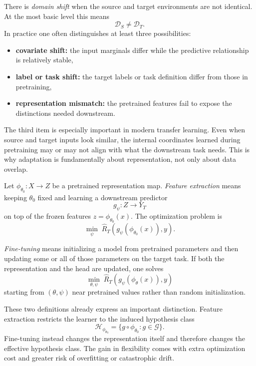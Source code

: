 \begin{definition}
There is \emph{domain shift} when the source and target environments are not identical.
At the most basic level this means
\[
\mathcal{D}_S \neq \mathcal{D}_T.
\]
In practice one often distinguishes at least three possibilities:
\begin{itemize}
    \item \textbf{covariate shift:} the input marginals differ while the predictive relationship is relatively stable,
    \item \textbf{label or task shift:} the target labels or task definition differ from those in pretraining,
    \item \textbf{representation mismatch:} the pretrained features fail to expose the distinctions needed downstream.
\end{itemize}
\end{definition}

The third item is especially important in modern transfer learning.
Even when source and target inputs look similar, the internal coordinates learned during pretraining may or may not align with what the downstream task needs.
This is why adaptation is fundamentally about representation, not only about data overlap.

\begin{definition}
Let $\phi_{\theta_0} : X \to Z$ be a pretrained representation map.
\emph{Feature extraction} means keeping $\theta_0$ fixed and learning a downstream predictor
\[
g_{\psi} : Z \to Y_T
\]
on top of the frozen features $z = \phi_{\theta_0}(x)$.
The optimization problem is
\[
\min_{\psi} \; \widehat R_T(g_{\psi}(\phi_{\theta_0}(x)),y).
\]
\end{definition}

\begin{definition}
\emph{Fine-tuning} means initializing a model from pretrained parameters and then updating some or all of those parameters on the target task.
If both the representation and the head are updated, one solves
\[
\min_{\theta,\psi} \; \widehat R_T(g_{\psi}(\phi_{\theta}(x)),y)
\]
starting from $(\theta,\psi)$ near pretrained values rather than random initialization.
\end{definition}

These two definitions already express an important distinction.
Feature extraction restricts the learner to the induced hypothesis class
\[
\mathcal{H}_{\phi_{\theta_0}} = \{g \circ \phi_{\theta_0} : g \in \mathcal{G}\}.
\]
Fine-tuning instead changes the representation itself and therefore changes the effective hypothesis class.
The gain in flexibility comes with extra optimization cost and greater risk of overfitting or catastrophic drift.

